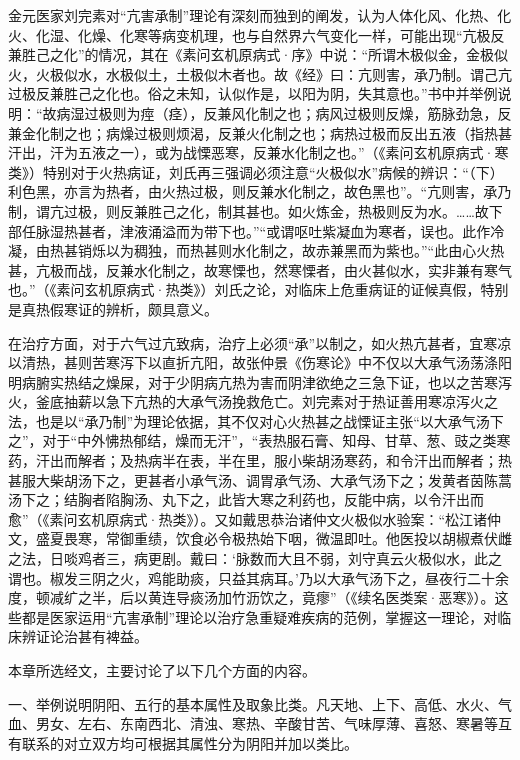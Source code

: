 \documentclass[12pt]{ctexbook}
\begin{document}
金元医家刘完素对“亢害承制”理论有深刻而独到的阐发，认为人体化风、化热、化火、化湿、化燥、化寒等病变机理，也与自然界六气变化一样，可能出现“亢极反兼胜己之化”的情况，其在《素问玄机原病式·序》中说：“所谓木极似金，金极似火，火极似水，水极似土，土极似木者也。故《经》曰：亢则害，承乃制。谓己亢过极反兼胜己之化也。俗之未知，认似作是，以阳为阴，失其意也。”书中并举例说明：“故病湿过极则为痙（痉），反兼风化制之也；病风过极则反燥，筋脉劲急，反兼金化制之也；病燥过极则烦渴，反兼火化制之也；病热过极而反出五液（指热甚汗出，汗为五液之一），或为战慄恶寒，反兼水化制之也。”（《素问玄机原病式·寒类》）特别对于火热病证，刘氏再三强调必须注意“火极似水”病候的辨识：“（下）利色黑，亦言为热者，由火热过极，则反兼水化制之，故色黑也”。“亢则害，承乃制，谓亢过极，则反兼胜己之化，制其甚也。如火炼金，热极则反为水。……故下部任脉湿热甚者，津液涌溢而为带下也。”“或谓呕吐紫凝血为寒者，误也。此作冷凝，由热甚销烁以为稠独，而热甚则水化制之，故赤兼黑而为紫也。”“此由心火热甚，亢极而战，反兼水化制之，故寒慄也，然寒慄者，由火甚似水，实非兼有寒气也。”（《素问玄机原病式·热类》）刘氏之论，对临床上危重病证的证候真假，特别是真热假寒证的辨析，颇具意义。

在治疗方面，对于六气过亢致病，治疗上必须“承”以制之，如火热亢甚者，宜寒凉以清热，甚则苦寒泻下以直折亢阳，故张仲景《伤寒论》中不仅以大承气汤荡涤阳明病腑实热结之燥屎，对于少阴病亢热为害而阴津欲绝之三急下证，也以之苦寒泻火，釜底抽薪以急下亢热的大承气汤挽救危亡。刘完素对于热证善用寒凉泻火之法，也是以“承乃制”为理论依据，其不仅对心火热甚之战慄证主张“以大承气汤下之”，对于“中外怫热郁结，燥而无汗”，“表热服石膏、知母、甘草、葱、豉之类寒药，汗出而解者；及热病半在表，半在里，服小柴胡汤寒药，和令汗出而解者；热甚服大柴胡汤下之，更甚者小承气汤、调胃承气汤、大承气汤下之；发黄者茵陈蒿汤下之；结胸者陷胸汤、丸下之，此皆大寒之利药也，反能中病，以令汗出而愈”（《素问玄机原病式·热类》）。又如戴思恭治诸仲文火极似水验案：“松江诸仲文，盛夏畏寒，常御重绩，饮食必令极热始下咽，微温即吐。他医投以胡椒煮伏雌之法，日啖鸡者三，病更剧。戴曰：‘脉数而大且不弱，刘守真云火极似水，此之谓也。椒发三阴之火，鸡能助痰，只益其病耳。’乃以大承气汤下之，昼夜行二十余度，顿减纩之半，后以黄连导痰汤加竹沥饮之，竟瘳”（《续名医类案·恶寒》）。这些都是医家运用“亢害承制”理论以治疗急重疑难疾病的范例，掌握这一理论，对临床辨证论治甚有裨益。

\xiaojie

本章所选经文，主要讨论了以下几个方面的内容。

一、举例说明阴阳、五行的基本属性及取象比类。凡天地、上下、高低、水火、气血、男女、左右、东南西北、清浊、寒热、辛酸甘苦、气味厚薄、喜怒、寒暑等互有联系的对立双方均可根据其属性分为阴阳并加以类比。
\end{document}
